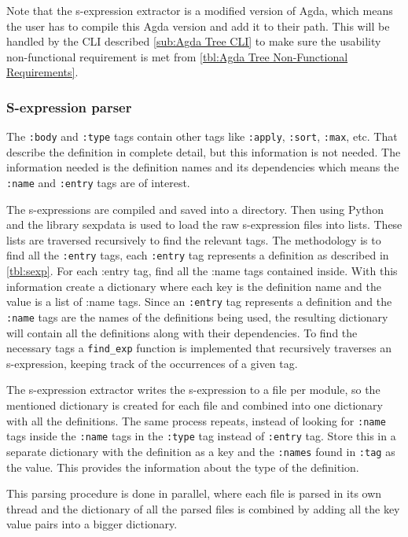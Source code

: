 Note that the s-expression extractor is a modified version of Agda, which means
the user has to compile this Agda version and add it to their path. This will
be handled by the CLI described \cref{sub:Agda Tree CLI} to make sure the
usability non-functional requirement is met from \cref{tbl:Agda Tree
Non-Functional Requirements}.

\subsubsection{S-expression parser}\label{sub:s-expression parser implementation}

The \texttt{:body} and \texttt{:type} tags contain other tags like
\texttt{:apply}, \texttt{:sort}, \texttt{:max}, etc. That describe the
definition in complete detail, but this information is not needed. The
information needed is the definition names and its dependencies which means the
\texttt{:name} and \texttt{:entry} tags are of interest.

The s-expressions are compiled and saved into a directory. Then using Python
and the library sexpdata is used to load the raw s-expression files into lists.
These lists are traversed recursively to find the relevant tags. The
methodology is to find all the \texttt{:entry} tags, each \texttt{:entry} tag
represents a definition as described in \cref{tbl:sexp}. For each :entry tag,
find all the :name tags contained inside. With this information create a
dictionary where each key is the definition name and the value is a list of
:name tags. Since an \texttt{:entry} tag represents a definition and the
\texttt{:name} tags are the names of the definitions being used, the resulting
dictionary will contain all the definitions along with their dependencies. To
find the necessary tags a \texttt{find\_exp} function is implemented that
recursively traverses an s-expression, keeping track of the occurrences of a
given tag.

The s-expression extractor writes the s-expression to a file per module, so the
mentioned dictionary is created for each file and combined into one dictionary
with all the definitions. The same process repeats, instead of looking for
\texttt{:name} tags inside the \texttt{:name} tags in the \texttt{:type} tag
instead of \texttt{:entry} tag. Store this in a separate dictionary with the
definition as a key and the \texttt{:names} found in \texttt{:tag} as the
value. This provides the information about the type of the definition.

This parsing procedure is done in parallel, where each file is parsed in its
own thread and the dictionary of all the parsed files is combined by
adding all the key value pairs into a bigger dictionary.

